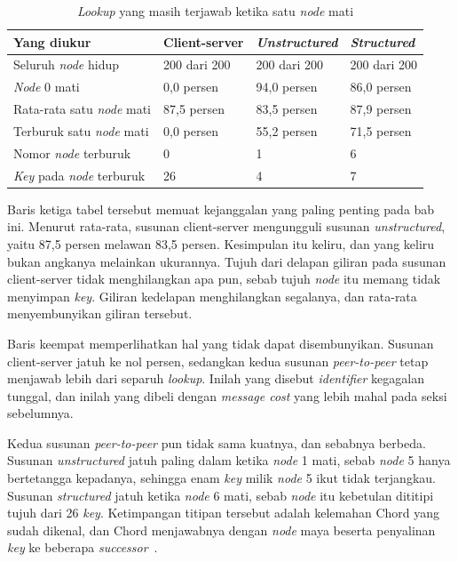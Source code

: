 \begin{table}[htbp]
  \centering
  \caption{\textit{Lookup} yang masih terjawab ketika satu \textit{node} mati}
  \label{tab:ketahanan-p2p}
  \begin{tabularx}{\textwidth}{|X|l|l|l|}
    \hline
    \textbf{Yang diukur} & \textbf{Client-server} & \textbf{\textit{Unstructured}} & \textbf{\textit{Structured}} \\
    \hline
    Seluruh \textit{node} hidup & 200 dari 200 & 200 dari 200 & 200 dari 200 \\
    \hline
    \textit{Node} 0 mati & 0,0 persen & 94,0 persen & 86,0 persen \\
    \hline
    Rata-rata satu \textit{node} mati & 87,5 persen & 83,5 persen & 87,9 persen \\
    \hline
    Terburuk satu \textit{node} mati & 0,0 persen & 55,2 persen & 71,5 persen \\
    \hline
    Nomor \textit{node} terburuk & 0 & 1 & 6 \\
    \hline
    \textit{Key} pada \textit{node} terburuk & 26 & 4 & 7 \\
    \hline
  \end{tabularx}
\end{table}

Baris ketiga tabel tersebut memuat kejanggalan yang paling penting pada bab
ini. Menurut rata-rata, susunan client-server mengungguli susunan
\textit{unstructured}, yaitu 87,5 persen melawan 83,5 persen. Kesimpulan itu keliru, dan
yang keliru bukan angkanya melainkan ukurannya. Tujuh dari delapan giliran pada
susunan client-server tidak menghilangkan apa pun, sebab tujuh \textit{node} itu
memang tidak menyimpan \textit{key}. Giliran kedelapan menghilangkan segalanya, dan
rata-rata menyembunyikan giliran tersebut.

Baris keempat memperlihatkan hal yang tidak dapat disembunyikan. Susunan
client-server jatuh ke nol persen, sedangkan kedua susunan
\textit{peer-to-peer} tetap menjawab lebih dari separuh \textit{lookup}. Inilah yang
disebut \textit{identifier} kegagalan tunggal, dan inilah yang dibeli dengan \textit{message cost}
yang lebih mahal pada seksi sebelumnya.

Kedua susunan \textit{peer-to-peer} pun tidak sama kuatnya, dan sebabnya
berbeda. Susunan \textit{unstructured} jatuh paling dalam ketika \textit{node} 1 mati,
sebab \textit{node} 5 hanya bertetangga kepadanya, sehingga enam \textit{key} milik \textit{node} 5
ikut tidak terjangkau. Susunan \textit{structured} jatuh ketika \textit{node} 6 mati, sebab
\textit{node} itu kebetulan dititipi tujuh dari 26 \textit{key}. Ketimpangan titipan tersebut
adalah kelemahan Chord yang sudah dikenal, dan Chord menjawabnya dengan \textit{node}
maya beserta penyalinan \textit{key} ke beberapa \textit{successor}~\cite{stoica2001chord}.

